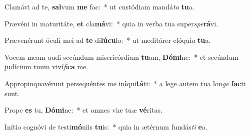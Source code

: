 \item Clamávi ad te, \textbf{sal}vum \textbf{me} fac:~* ut custódiam mandá\textit{ta} \textbf{tu}a.
\item Prævéni in maturitáte, \textbf{et} cla\textbf{má}vi:~* quia in verba tua super\textit{spe}\textbf{rá}vi.
\item Prævenérunt óculi mei ad \textbf{te} di\textbf{lú}\textbf{cu}lo:~* ut meditárer elóqui\textit{a} \textbf{tu}a.
\item Vocem meam audi secúndum misericórdiam \textbf{tu}am, \textbf{Dó}\textbf{mi}ne:~* et secúndum judícium tuum viví\textit{fi}\textbf{ca} me.
\item Appropinquavérunt persequéntes me in\textbf{i}qui\textbf{tá}ti:~* a lege autem tua lon\textit{ge} \textbf{fac}ti sunt.
\item Prope \textbf{es} tu, \textbf{Dó}\textbf{mi}ne:~* et omnes viæ tu\textit{æ} \textbf{vé}ritas.
\item Inítio cognóvi de testi\textbf{mó}niis \textbf{tu}is:~* quia in ætérnum fundás\textit{ti} \textbf{e}a.

